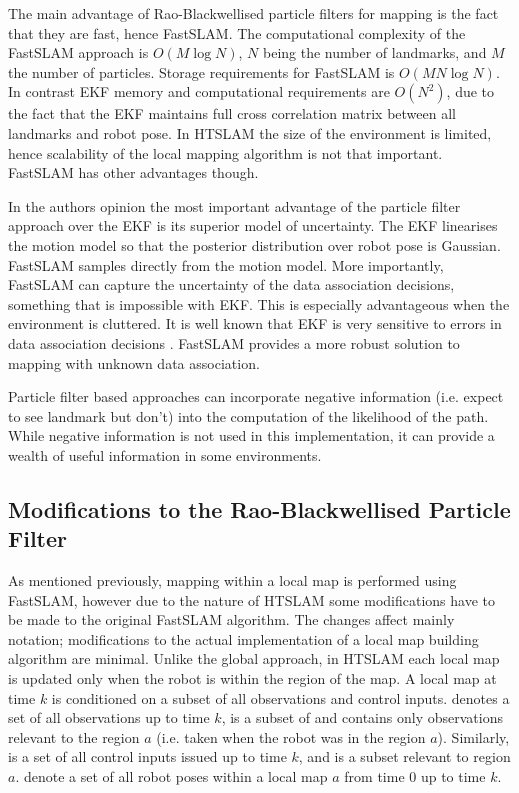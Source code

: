 The main advantage of Rao-Blackwellised particle filters for mapping
is the fact that they are fast, hence FastSLAM. The computational
complexity of the FastSLAM approach is $O(M \log N)$, $N$ being the
number of landmarks, and $M$ the number of particles. Storage
requirements for FastSLAM is $O(M N \log N)$. In contrast EKF memory
and computational requirements are $O(N^2)$, due to the fact that the
EKF maintains full cross correlation matrix between all landmarks and
robot pose. In HTSLAM the size of the environment is limited, hence
scalability of the local mapping algorithm is not that
important. FastSLAM has other advantages though.

In the authors opinion the most important advantage of the particle
filter approach over the EKF is its superior model of uncertainty. The
EKF linearises the motion model so that the posterior distribution
over robot pose is Gaussian. FastSLAM samples directly from the motion
model. More importantly, FastSLAM can capture the uncertainty of the
data association decisions, something that is impossible with EKF.
This is especially advantageous when the environment is cluttered. It
is well known that EKF is very sensitive to errors in data association
decisions \cite{neira01:_data_assoc_stoch_mappin_using}. FastSLAM
provides a more robust solution to mapping with unknown data
association.

Particle filter based approaches can incorporate negative information
(i.e. expect to see landmark but don't) into the computation of the
likelihood of the path. While negative information is not used in this
implementation, it can provide a wealth of useful information in some
environments.


\subsection{Modifications to the Rao-Blackwellised Particle Filter}


As mentioned previously, mapping within a local map is performed using
FastSLAM, however due to the nature of HTSLAM some modifications have
to be made to the original FastSLAM algorithm. The changes affect
mainly notation; modifications to the actual implementation of a local
map building algorithm are minimal.  Unlike the global approach, in
HTSLAM each local map is updated only when the robot is within the
region of the map. A local map at time $k$ is conditioned on a subset
of all observations and control inputs.  denotes a set of
all observations up to time $k$,  is a subset of 
and contains only observations relevant to the region $a$ (i.e. taken
when the robot was in the region $a$). Similarly,  is a set
of all control inputs issued up to time $k$, and  is a
subset relevant to region $a$.  denote a set of all robot
poses within a local map $a$ from time $0$ up to time $k$.

